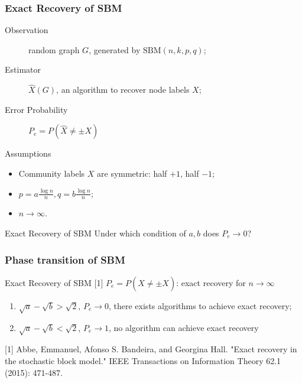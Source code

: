 \documentclass[notheorems]{beamer}
\begin{document}
\begin{frame}
\frametitle{Exact Recovery of SBM}
\begin{description}
	\item[Observation] random graph $G$, generated by $\textrm{SBM}(n,k,p,q)$;
	\item[Estimator] $\hat{X}(G)$, an algorithm to recover node labels $X$;
	\item[Error Probability] $P_e=P(\hat{X} \neq \pm X)$
\end{description}

\begin{block}{Assumptions}
	\begin{itemize}
	\item Community labels $X$ are symmetric: half $+1$, half $-1$;
	\item $p = a\frac{ \log n}{n}, q = b \frac{ \log n}{n}$;
	\item $n \to \infty$.
	\end{itemize}
\end{block}
\begin{block}{Exact Recovery of SBM}
Under which condition of $a,b$ does $P_e \to 0$?
\end{block}
\end{frame}
\begin{frame}
\frametitle{Phase transition of SBM}
\begin{block}{Exact Recovery of SBM [1]}
	$P_e=P(\hat{X} \neq \pm X)$: exact recovery for $n \to \infty$
	\begin{enumerate}
		\item $\sqrt{a} - \sqrt{b} > \sqrt{2}$, $P_e \to 0$, there exists algorithms to achieve exact recovery;
		\item $\sqrt{a} - \sqrt{b} < \sqrt{2}$, $P_e \to 1$, no algorithm can achieve exact recovery
	\end{enumerate}
\end{block}
{\scriptsize [1]
Abbe, Emmanuel, Afonso S. Bandeira, and Georgina Hall. "Exact recovery in the stochastic block model." IEEE Transactions on Information Theory 62.1 (2015): 471-487.
}
\end{frame}
\end{document}
